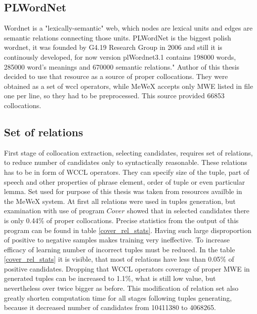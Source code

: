 \subsection{PLWordNet}
Wordnet is a "lexically-semantic" web, which nodes are lexical units and edges are semantic relations connecting those units.
PLWordNet is the biggest polish wordnet, it was founded by G4.19 Research Group in 2006 and still it is continously developed, 
for now version plWordnet3.1 contains 198000 words, 285000 word's meanings and 670000 semantic relations." Author of this thesis decided to use that resource 
as a source of proper collocations. They were obtained as a set of wccl operators, while MeWeX accepts only MWE listed in file one per line, 
so they had to be preprocessed. This source provided 66853 collocations.

\subsection{Set of relations}
First stage of collocation extraction, selecting candidates, requires set of relations, to reduce number of candidates only to syntactically reasonable. 
These relations has to be in form of WCCL operators. They can specify size of the tuple, part of speech and other properties of phrase element, 
order of tuple or even particular lemma. Set used for purpose of this thesis was taken from resources availble in the MeWeX system. 
At first all relations were used in tuples generation, but examination with use of program \(Cover\) showed that in selected candidates 
there is only 0.44\% of proper collocations. Precise statistics from the output of this program can be found in table \ref{cover_rel_stats}.
Having such large disproportion of positive to negative samples makes training very ineffective. To increase efficacy of learning 
number of incorrect tuples must be reduced. In the table \ref{cover_rel_stats} it is visible, that most of relations have less than 0.05\% 
of positive candidates. Dropping that WCCL operators coverage of proper MWE in generated tuples can be increased to 1.1\%, 
what is still low value, but nevertheless over twice bigger as before. This modification of relation set also greatly shorten computation time 
for all stages following tuples generating, because it decreased number of candidates from 10411380 to 4068265.

